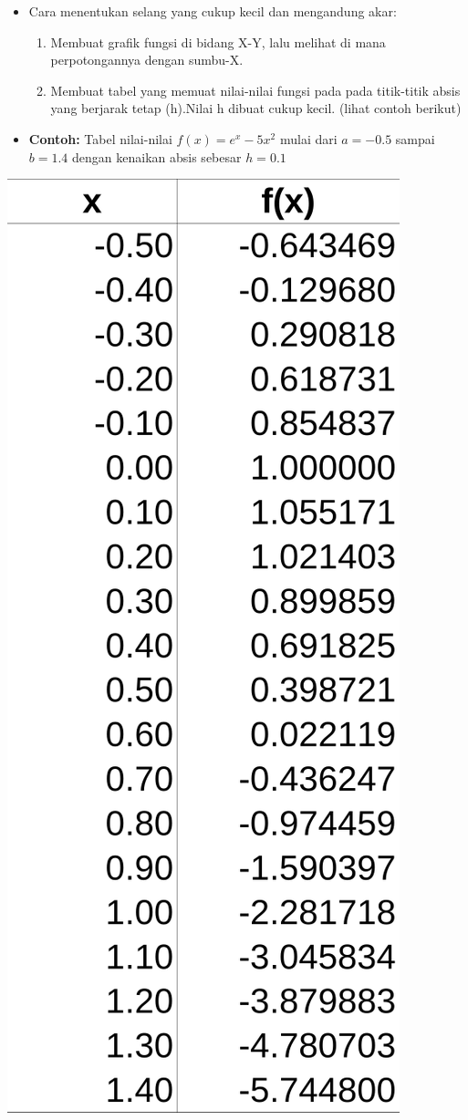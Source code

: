 \documentclass[pdflatex,compress]{beamer}
\begin{document}
\begin{frame}
	\begin{itemize}
		\item Cara menentukan selang yang cukup kecil dan mengandung akar:
		\begin{enumerate}
			\item Membuat grafik fungsi di bidang X-Y, lalu melihat di mana perpotongannya dengan sumbu-X.
			\item Membuat tabel yang memuat nilai-nilai fungsi pada pada titik-titik absis yang berjarak tetap (h).Nilai h dibuat cukup kecil. (lihat contoh berikut)
		\end{enumerate}
	\end{itemize}
\end{frame}

\begin{frame}
	\begin{itemize}
		\item \textbf{Contoh:} Tabel nilai-nilai $ f(x) = e^x - 5x^2 $ mulai dari $ a = -0.5 $ sampai $ b = 1.4 $ dengan kenaikan absis sebesar $ h = 0.1 $		
	\end{itemize}
	\begin{multicols}{2}
	\begin{center}
		\includegraphics[width=0.5\linewidth]{img/img04.png}

\end{center}
\end{multicols}
\end{frame}
\end{document}
